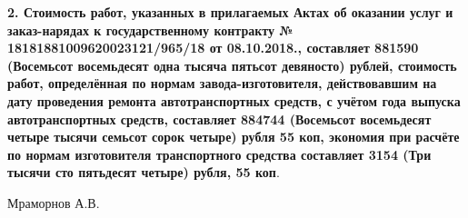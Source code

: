 \vspace{4mm}
	
\textbf{2. Стоимость работ, указанных в прилагаемых Актах об оказании услуг и заказ-нарядах к государственному контракту  № 18181881009620023121/965/18 от 08.10.2018., составляет 881590 (Восемьсот восемьдесят одна тысяча пятьсот девяносто) рублей, стоимость работ, определённая  по нормам завода-изготовителя, действовавшим на дату проведения ремонта автотранспортных средств, с учётом года выпуска автотранспортных средств, составляет 884744 (Восемьсот восемьдесят четыре тысячи семьсот сорок четыре) рубля 55 коп, экономия при расчёте по нормам изготовителя транспортного средства составляет 3154 (Три тысячи сто пятьдесят четыре) рубля, 55 коп}.



\relax

\vspace{20mm}

\hfill           {Мраморнов А.В.}

%
%